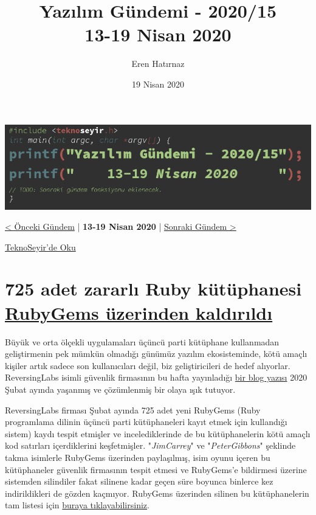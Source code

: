 \documentclass[11pt]{article}
\author{Eren Hatırnaz}
\date{19 Nisan 2020}
\title{Yazılım Gündemi - 2020/15\\\medskip
\large 13-19 Nisan 2020}
\begin{document}
\maketitle
\tableofcontents \clearpage\shorthandoff{=}

\begin{center}
\includegraphics[width=.9\linewidth]{gorseller/yazilim-gundemi-banner.png}
\end{center}

\begin{center}
\href{../14/yazilim-gundemi-2020-14.pdf}{< Önceki Gündem} | \textbf{13-19 Nisan 2020} | \href{../16/yazilim-gundemi-2020-16.pdf}{Sonraki Gündem >}

\href{https://teknoseyir.com/blog/yazilim-gundemi-2020-15}{TeknoSeyir'de Oku}
\end{center}

\section{725 adet zararlı Ruby kütüphanesi \href{https://www.zdnet.com/article/clipboard-hijacking-malware-found-in-725-ruby-libraries/}{RubyGems üzerinden kaldırıldı}}
\label{sec:org923e919}
Büyük ve orta ölçekli uygulamaları üçüncü parti kütüphane kullanmadan
geliştirmenin pek mümkün olmadığı günümüz yazılım ekosisteminde, kötü amaçlı
kişiler artık sadece son kullanıcıları değil, biz geliştiricileri de hedef
alıyorlar. ReversingLabs isimli güvenlik firmasının bu hafta yayınladığı \href{https://blog.reversinglabs.com/blog/mining-for-malicious-ruby-gems}{bir
blog yazısı} 2020 Şubat ayında yaşanmış ve çözümlenmiş bir olaya ışık tutuyor.

ReversingLabs firması Şubat ayında 725 adet yeni RubyGems (Ruby programlama
dilinin üçüncü parti kütüphaneleri kayıt etmek için kullandığı sistem) kaydı
tespit etmişler ve incelediklerinde de bu kütüphanelerin kötü amaçlı kod
satırları içerdiklerini keşfetmişler. "\emph{JimCarrey}" ve "\emph{PeterGibbons}"
şeklinde takma isimlerle RubyGems üzerinden paylaşılmış, isim oyunu içeren bu
kütüphaneler güvenlik firmasının tespit etmesi ve RubyGems'e bildirmesi
üzerine sistemden silindiler fakat silinene kadar geçen süre boyunca binlerce
kez indirildikleri de gözden kaçmıyor. RubyGems üzerinden silinen bu
kütüphanelerin tam listesi için \href{https://blog.reversinglabs.com/hubfs/Blog/ruby\_malicious\_gems.txt}{buraya tıklayabilirsiniz}.
\end{document}
